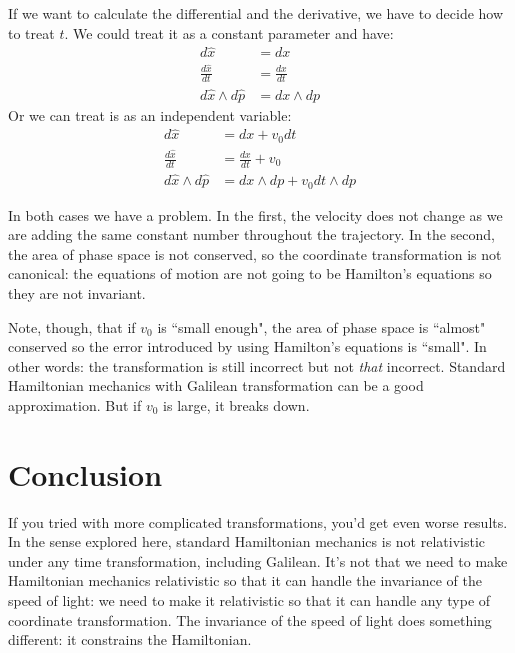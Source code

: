\documentclass[aps,pra,10pt,floatfix,nofootinbib]{revtex4-1}
\theoremstyle{definition}
\begin{document}
If we want to calculate the differential and the derivative, we have to decide how to treat $t$. We could treat it as a constant parameter and have:
\begin{equation}
\begin{aligned}
d\hat{x} &= dx \\
\frac{d\hat{x}}{dt} &= \frac{dx}{dt} \\
d\hat{x}\wedge d\hat{p} &= dx \wedge dp
\end{aligned}
\label{timeParameter}
\end{equation}
Or we can treat is as an independent variable:
\begin{equation}
\begin{aligned}
d\hat{x} &= dx + v_0 dt \\
\frac{d\hat{x}}{dt} &= \frac{dx}{dt} + v_0 \\
d\hat{x}\wedge d\hat{p} &= dx \wedge dp + v_0 dt \wedge dp
\end{aligned}
\label{timeParameter}
\end{equation}

In both cases we have a problem. In the first, the velocity does not change as we are adding the same constant number throughout the trajectory. In the second, the area of phase space is not conserved, so the coordinate transformation is not canonical: the equations of motion are not going to be Hamilton's equations so they are not invariant.

Note, though, that if $v_0$ is ``small enough", the area of phase space is ``almost" conserved so the error introduced by using Hamilton's equations is ``small". In other words: the transformation is still incorrect but not \emph{that} incorrect. Standard Hamiltonian mechanics with Galilean transformation can be a good approximation. But if $v_0$ is large, it breaks down.

\section{Conclusion}

If you tried with more complicated transformations, you'd get even worse results. In the sense explored here, standard Hamiltonian mechanics is not relativistic under any time transformation, including Galilean. It's not that we need to make Hamiltonian mechanics relativistic so that it can handle the invariance of the speed of light: we need to make it relativistic so that it can handle any type of coordinate transformation. The invariance of the speed of light does something different: it constrains the Hamiltonian.
\end{document}

